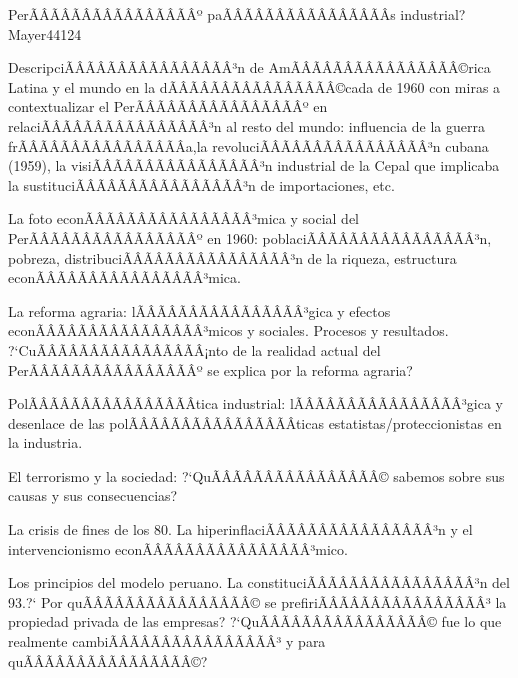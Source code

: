 \begin{syllabus}
\begin{competences}
    \item {}
    \item {}
    \item {}
    \item {}
\end{competences}

\begin{unit}{PerÃÂÃÂÃÂÃÂÃÂÃÂÃÂÃÂº paÃÂÃÂÃÂÃÂÃÂÃÂÃÂÃÂ­s industrial?}{}{Mayer44}{12}{4}
   \begin{topics}
      \item DescripciÃÂÃÂÃÂÃÂÃÂÃÂÃÂÃÂ³n de AmÃÂÃÂÃÂÃÂÃÂÃÂÃÂÃÂ©rica Latina y el mundo en la dÃÂÃÂÃÂÃÂÃÂÃÂÃÂÃÂ©cada de 1960 con miras a contextualizar el PerÃÂÃÂÃÂÃÂÃÂÃÂÃÂÃÂº en relaciÃÂÃÂÃÂÃÂÃÂÃÂÃÂÃÂ³n al resto del mundo: influencia de la guerra frÃÂÃÂÃÂÃÂÃÂÃÂÃÂÃÂ­a,la revoluciÃÂÃÂÃÂÃÂÃÂÃÂÃÂÃÂ³n cubana (1959), la visiÃÂÃÂÃÂÃÂÃÂÃÂÃÂÃÂ³n industrial de la Cepal que implicaba la sustituciÃÂÃÂÃÂÃÂÃÂÃÂÃÂÃÂ³n de importaciones, etc.
      \item La foto econÃÂÃÂÃÂÃÂÃÂÃÂÃÂÃÂ³mica y social del PerÃÂÃÂÃÂÃÂÃÂÃÂÃÂÃÂº en 1960: poblaciÃÂÃÂÃÂÃÂÃÂÃÂÃÂÃÂ³n, pobreza, distribuciÃÂÃÂÃÂÃÂÃÂÃÂÃÂÃÂ³n de la riqueza, estructura econÃÂÃÂÃÂÃÂÃÂÃÂÃÂÃÂ³mica.
      \item La reforma agraria: lÃÂÃÂÃÂÃÂÃÂÃÂÃÂÃÂ³gica y efectos econÃÂÃÂÃÂÃÂÃÂÃÂÃÂÃÂ³micos y sociales. Procesos y resultados. ?`CuÃÂÃÂÃÂÃÂÃÂÃÂÃÂÃÂ¡nto de la realidad actual del PerÃÂÃÂÃÂÃÂÃÂÃÂÃÂÃÂº se explica por la reforma agraria?
      \item PolÃÂÃÂÃÂÃÂÃÂÃÂÃÂÃÂ­tica industrial: lÃÂÃÂÃÂÃÂÃÂÃÂÃÂÃÂ³gica y desenlace de las polÃÂÃÂÃÂÃÂÃÂÃÂÃÂÃÂ­ticas estatistas/proteccionistas en la industria.
      \item El terrorismo y la sociedad: ?`QuÃÂÃÂÃÂÃÂÃÂÃÂÃÂÃÂ© sabemos sobre sus causas y sus consecuencias?
      \item La crisis de fines de los 80. La hiperinflaciÃÂÃÂÃÂÃÂÃÂÃÂÃÂÃÂ³n y el intervencionismo econÃÂÃÂÃÂÃÂÃÂÃÂÃÂÃÂ³mico.
      \item Los principios del modelo peruano. La constituciÃÂÃÂÃÂÃÂÃÂÃÂÃÂÃÂ³n del 93.?` Por quÃÂÃÂÃÂÃÂÃÂÃÂÃÂÃÂ© se prefiriÃÂÃÂÃÂÃÂÃÂÃÂÃÂÃÂ³ la propiedad privada de las empresas? ?`QuÃÂÃÂÃÂÃÂÃÂÃÂÃÂÃÂ© fue lo que realmente cambiÃÂÃÂÃÂÃÂÃÂÃÂÃÂÃÂ³ y para quÃÂÃÂÃÂÃÂÃÂÃÂÃÂÃÂ©?

\end{topics}
\end{unit}
\end{syllabus}
